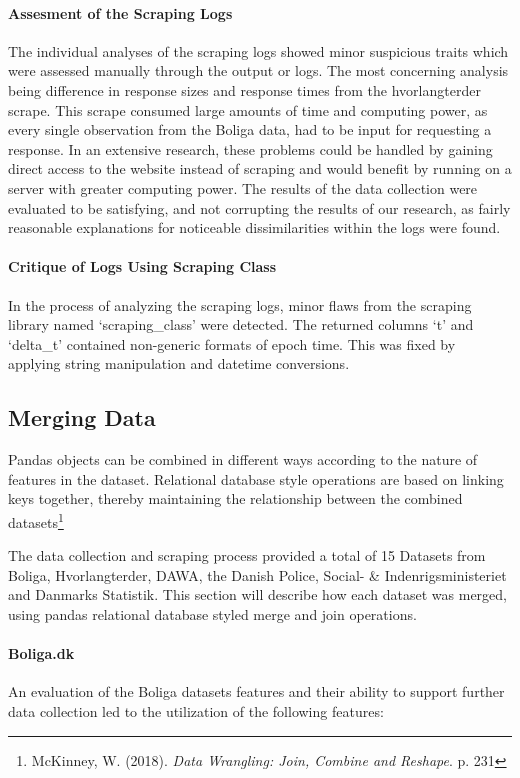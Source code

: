 \documentclass[12pt,a4paper]{article}
\begin{document}
\paragraph{Assesment of the Scraping Logs\newline}
The individual analyses of the scraping logs showed minor suspicious traits which were assessed manually through the output or logs. The most concerning analysis being difference in response sizes and response times from the hvorlangterder scrape. This scrape consumed large amounts of time and computing power, as every single observation from the Boliga data, had to be input for requesting a response. In an extensive research, these problems could be handled by gaining direct access to the website instead of scraping and would benefit by running on a server with greater computing power. The results of the data collection were evaluated to be satisfying, and not corrupting the results of our research, as fairly reasonable explanations for noticeable dissimilarities within the logs were found. 

\paragraph{Critique of Logs Using Scraping Class\newline}
In the process of analyzing the scraping logs, minor flaws from the scraping library named ‘scraping\_class’ were detected. The returned columns ‘t’ and ‘delta\_t’ contained non-generic formats of epoch time. This was fixed by applying string manipulation and datetime conversions. 

\subsection{Merging Data}
Pandas objects can be combined in different ways according to the nature of features in the dataset. Relational database style operations are based on linking keys together, thereby maintaining the relationship between the combined datasets\footnote{McKinney, W. (2018). \textit{Data Wrangling: Join, Combine and Reshape}. p. 231 }

The data collection and scraping process provided a total of 15 Datasets from Boliga, Hvorlangterder, DAWA, the Danish Police, Social- \& Indenrigsministeriet and Danmarks Statistik. This section will describe how each dataset was merged, using pandas relational database styled merge and join operations. 

\paragraph{Boliga.dk\newline}
An evaluation of the Boliga datasets features and their ability to support further data collection led to the utilization of the following features: 
\end{document}
